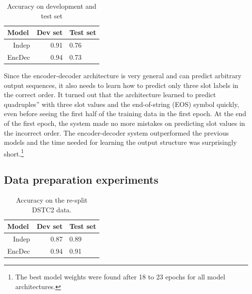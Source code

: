\documentclass{itatnew}
\def\OD#1{{\color{darkgreen}OD: \it #1}}
\begin{document}
\begin{table}
\begin{center}
\begin{tabular}{r@{\quad}rll}
\hline
\multicolumn{1}{l}{\rule{0pt}{12pt}
                   Model}&\multicolumn{1}{l}{Dev set}&\multicolumn{2}{l}{Test set}\\[2pt]
\hline\rule{0pt}{12pt}
Indep  &   0.91 & 0.76 \\
EncDec &   0.94 & 0.73 \\
\hline
\end{tabular}
\caption{Accuracy on development and test set}
\vspace{-2em}
\end{center}
\label{tab:dstc}
\end{table}


Since the encoder-decoder architecture is very general and can predict arbitrary output sequences, it also needs to learn how to predict only three slot labels in the correct order.
It turned out that the architecture learned to predict quadruples” with three slot values and the end-of-string (EOS) symbol quickly, even before seeing the first half of the training data in the first epoch.
At the end of the first epoch, the system made no more mistakes on predicting slot values in the incorrect order.
The encoder-decoder system 
outperformed the previous models and the time needed for learning the output structure was surprisingly short.\footnote{The best model weights were found after 18 to 23 epochs for all model architectures.}


\subsection{Data preparation experiments}
\label{sec:split}

\begin{table}
\begin{center}
\begin{tabular}{r@{\quad}rll}
\hline
\multicolumn{1}{l}{\rule{0pt}{12pt}
                   Model}&\multicolumn{1}{l}{Dev set}&\multicolumn{2}{l}{Test set}\\[2pt]
\hline\rule{0pt}{12pt}
Indep  &   0.87 & 0.89 \\
EncDec &   0.94 & 0.91 \\
\hline
\end{tabular}
\caption{Accuracy on the re-split DSTC2 data.}
\vspace{-2em}
\end{center}
\label{tabsplit}
\end{table}
\end{document}
